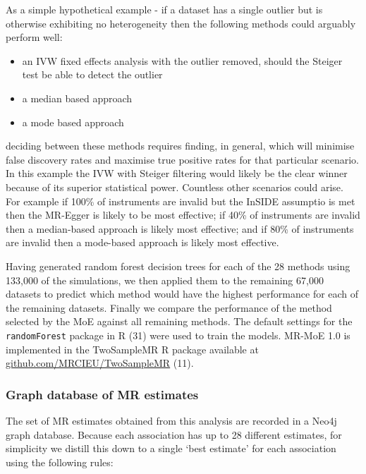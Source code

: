 \documentclass[]{article}
\providecommand{\tightlist}{%
  \setlength{\itemsep}{0pt}\setlength{\parskip}{0pt}}
\begin{document}
As a simple hypothetical example - if a dataset has a single outlier but
is otherwise exhibiting no heterogeneity then the following methods
could arguably perform well:

\begin{itemize}
\tightlist
\item
  an IVW fixed effects analysis with the outlier removed, should the
  Steiger test be able to detect the outlier
\item
  a median based approach
\item
  a mode based approach
\end{itemize}

deciding between these methods requires finding, in general, which will
minimise false discovery rates and maximise true positive rates for that
particular scenario. In this example the IVW with Steiger filtering
would likely be the clear winner because of its superior statistical
power. Countless other scenarios could arise. For example if 100\% of
instruments are invalid but the InSIDE assumptio is met then the
MR-Egger is likely to be most effective; if 40\% of instruments are
invalid then a median-based approach is likely most effective; and if
80\% of instruments are invalid then a mode-based approach is likely
most effective.

Having generated random forest decision trees for each of the 28 methods
using 133,000 of the simulations, we then applied them to the remaining
67,000 datasets to predict which method would have the highest
performance for each of the remaining datasets. Finally we compare the
performance of the method selected by the MoE against all remaining
methods. The default settings for the \texttt{randomForest} package in R
(31) were used to train the models. MR-MoE 1.0 is implemented in the
TwoSampleMR R package available at
\href{https://github.com/MRCIEU/TwoSampleMR}{github.com/MRCIEU/TwoSampleMR}
(11).

\subsubsection{Graph database of MR
estimates}\label{graph-database-of-mr-estimates}

The set of MR estimates obtained from this analysis are recorded in a
Neo4j graph database. Because each association has up to 28 different
estimates, for simplicity we distill this down to a single `best
estimate' for each association using the following rules:
\end{document}
